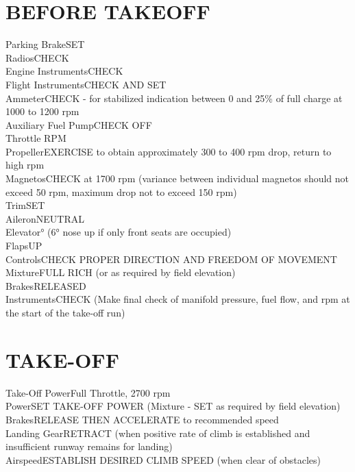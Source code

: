 \documentclass{article}
\begin{document}
\begin{multicols*}{2}
\section*{BEFORE TAKEOFF}
Parking Brake\dotfill SET\\
Radios\dotfill CHECK\\
Engine Instruments\dotfill CHECK\\
Flight Instruments\dotfill CHECK AND SET\\
Ammeter\dotfill CHECK - for stabilized indication between 0 and 25\% of full charge at 1000 to 1200 rpm\\
Auxiliary Fuel Pump\dotfill CHECK OFF\\
Throttle RPM\\
Propeller\dotfill EXERCISE to obtain approximately 300 to 400 rpm drop, return to high rpm\\
Magnetos\dotfill CHECK at 1700 rpm (variance between individual magnetos should not exceed 50 rpm, maximum drop not to exceed 150 rpm)\\
Trim\dotfill SET\\
\hspace*{6mm} Aileron\dotfill NEUTRAL\\
\hspace*{6mm} Elevator° (6° nose up if only front seats are occupied)\\
Flaps\dotfill UP\\
Controls\dotfill CHECK PROPER DIRECTION AND FREEDOM OF MOVEMENT\\
Mixture\dotfill FULL RICH (or as required by field elevation)\\
Brakes\dotfill RELEASED\\
Instruments\dotfill CHECK (Make final check of manifold pressure, fuel flow, and rpm at the start of the take-off run)
\section*{TAKE-OFF}
Take-Off Power\dotfill Full Throttle, 2700 rpm\\
Power\dotfill SET TAKE-OFF POWER (Mixture - SET as required by field elevation)\\
Brakes\dotfill RELEASE THEN ACCELERATE to recommended speed\\
Landing Gear\dotfill RETRACT (when  positive rate of climb is established and insufficient runway remains for landing)\\
Airspeed\dotfill ESTABLISH DESIRED CLIMB SPEED (when clear of obstacles)

\end{multicols*}
\end{document}
